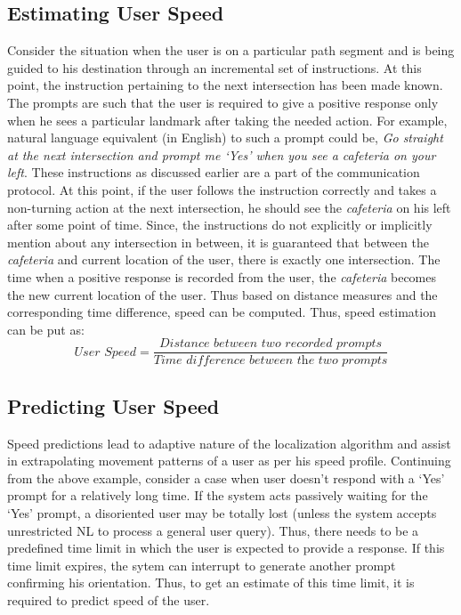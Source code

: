 \documentclass{iitkthesis}
\begin{document}
\subsection{Estimating User Speed}
Consider the situation when the user is on a particular path segment and is being guided to his destination through an incremental set of instructions. At this point, the instruction pertaining to the next intersection has been made known. The prompts are such that the user is required to give a positive response only when he sees a particular landmark after taking the needed action. For example, natural language equivalent (in English) to such a prompt could be, \textit{Go straight at the next intersection and prompt me `Yes' when you see a cafeteria on your left}. These instructions as discussed earlier are a part of the communication protocol. At this point, if the user follows the instruction correctly and takes a non-turning action at the next intersection, he should see the \textit{cafeteria} on his left after some point of time. Since, the instructions do not explicitly or implicitly mention about any intersection in between, it is guaranteed that between the \textit{cafeteria} and current location of the user, there is exactly one intersection. The time when a positive response is recorded from the user, the \textit{cafeteria} becomes the new current location of the user. Thus based on distance measures and the corresponding time difference, speed can be computed. Thus, speed estimation can be put as:
\[\displaystyle \textit{User Speed}=\frac{\textit{Distance between two recorded prompts}}{\textit{Time difference between the two prompts}}\]
\subsection{Predicting User Speed}
Speed predictions lead to adaptive nature of the localization algorithm and assist in extrapolating movement patterns of a user as per his speed profile. Continuing from the above example, consider a case when user doesn't respond with a `Yes' prompt for a relatively long time. If the system acts passively waiting for the `Yes' prompt, a disoriented user may be totally lost (unless the system accepts unrestricted NL to process a general user query). Thus, there needs to be a predefined time limit in which the user is expected to provide a response. If this time limit expires, the sytem can interrupt to generate another prompt confirming his orientation. Thus, to get an estimate of this time limit, it is required to predict speed of the user. 
\end{document}
